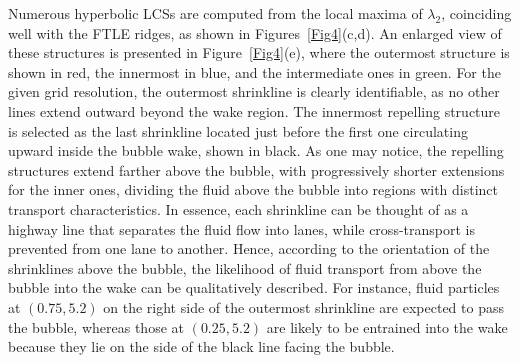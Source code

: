 \documentclass[aps,prfluids,reprint,nofootinbib,onecolumn,groupedaddress,showkeys]{revtex4-2}
\begin{document}
	Numerous hyperbolic LCSs are computed from the local maxima of $\lambda_2$, coinciding well with the FTLE ridges, as shown in Figures~\ref{Fig4}(c,d). An enlarged view of these structures is presented in Figure~\ref{Fig4}(e), where the outermost structure is shown in red, the innermost in blue, and the intermediate ones in green. For the given grid resolution, the outermost shrinkline is clearly identifiable, as no other lines extend outward beyond the wake region. The innermost repelling structure is selected as the last shrinkline located just before the first one circulating upward inside the bubble wake, shown in black. As one may notice, the repelling structures extend farther above the bubble, with progressively shorter extensions for the inner ones, dividing the fluid above the bubble into regions with distinct transport characteristics. In essence, each shrinkline can be thought of as a highway line that separates the fluid flow into lanes, while cross-transport is prevented from one lane to another. Hence, according to the orientation of the shrinklines above the bubble, the likelihood of fluid transport from above the bubble into the wake can be qualitatively described. For instance, fluid particles at $(0.75, 5.2)$ on the right side of the outermost shrinkline are expected to pass the bubble, whereas those at $(0.25, 5.2)$ are likely to be entrained into the wake because they lie on the side of the black line facing the bubble.
	
\end{document}
